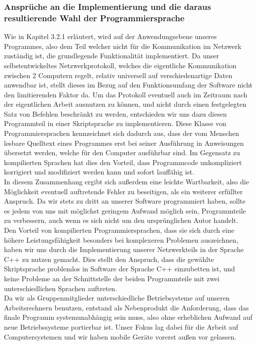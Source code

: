 \subsubsection{Ansprüche an die Implementierung und die daraus resultierende Wahl der Programmiersprache}
Wie in Kapitel 3.2.1 erläutert, wird auf der Anwendungsebene unseres Programmes, also dem Teil welcher nicht für die Kommunikation im Netzwerk zuständig ist, die grundlegende Funktionalität implementiert. Da unser selbstentwickeltes Netzwerkprotokoll, welches die eigentliche Kommunikation zwischen 2 Computern regelt, relativ universell auf verschiedenartige Daten anwendbar ist, stellt dieses im Bezug auf den Funktionsumfang der Software nicht den limitierenden Faktor da. Um das Protokoll eventuell auch im Zeitraum nach der eigentlichen Arbeit ausnutzen zu können, und nicht durch einen festgelegten Satz von Befehlen beschränkt zu werden, entschieden wir uns dazu diesen Programmteil in einer Skriptsprache zu implementieren.
Diese Klasse von Programmiersprachen kennzeichnet sich dadurch aus, dass der vom Menschen lesbare Quelltext eines Programmes erst bei seiner Ausführung in Anweisungen übersetzt werden, welche für den Computer ausführbar sind. Im Gegensatz zu kompilierten Sprachen hat dies den Vorteil, dass Programmcode unkompliziert korrigiert und modifiziert werden kann und sofort lauffähig ist.\\
In diesem Zusammenhang ergibt sich außerdem eine leichte Wartbarkeit, also die Möglichkeit eventuell auftretende Fehler zu beseitigen, als ein weiterer erfüllter Anspruch. Da wir stets zu dritt an unserer Software programmiert haben, sollte es jedem von uns mit möglichst geringem Aufwand möglich sein, Programmteile zu verbessern, auch wenn es sich nicht um den ursprünglichen Autor handelt.\\
Den Vorteil von kompilierten Programmiersprachen, dass sie sich durch eine höhere Leistungsfähigkeit besonders bei komplexeren Problemen auszeichnen, haben wir uns durch die Implementierung unserer Netzwerkteils in der Sprache C++ zu nutzen gemacht. Dies stellt den Anspruch, dass die gewählte Skriptsprache problemlos in Software der Sprache C++ einzubetten ist, und keine Probleme an der Schnittstelle der beiden Programmteile mit zwei unterschiedlichen Sprachen auftreten.\\
Da wir als Gruppenmitglieder unterschiedliche Betriebsysteme auf unseren Arbeitsrechnern benutzen, entstand als Nebenprodukt die Anforderung, dass das finale Programm systemunabhängig sein muss, also ohne erheblichen Aufwand auf neue Betriebssysteme portierbar ist. Unser Fokus lag dabei für die Arbeit auf Computersystemen und wir haben mobile Geräte vorerst außen vor gelassen.
